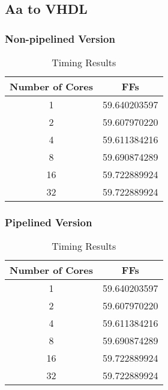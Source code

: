 \subsection{Aa to VHDL}

\subsubsection*{Non-pipelined Version}

\begin{table}[H]
\centering
\begin{tabular}{c | c}
\hline
Number of Cores & FFs \\
\hline
1 & 59.640203597 \\
2 & 59.607970220 \\
4 & 59.611384216 \\
8 & 59.690874289 \\
16 & 59.722889924\\
32 & 59.722889924
\end{tabular}
\caption{Timing Results}
\end{table}

\subsubsection*{Pipelined Version}

\begin{table}[H]
\centering
\begin{tabular}{c | c}
\hline
Number of Cores & FFs \\
\hline
1 & 59.640203597 \\
2 & 59.607970220 \\
4 & 59.611384216 \\
8 & 59.690874289 \\
16 & 59.722889924\\
32 & 59.722889924
\end{tabular}
\caption{Timing Results}
\end{table}

